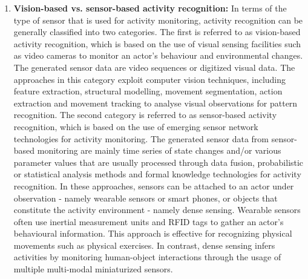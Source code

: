\begin{enumerate}
 \item \textbf{Vision-based vs. sensor-based activity recognition:} In terms of the type of sensor that is used for activity monitoring, activity recognition can be generally classified into two categories. The first is referred to as vision-based activity recognition, which is based on the use of visual sensing facilities such as video cameras to monitor an actor’s behaviour and environmental changes. The generated sensor data are video sequences or digitized visual data. The approaches in this category exploit computer vision techniques, including feature extraction, structural modelling, movement segmentation, action extraction and movement tracking to analyse visual observations for pattern recognition. The second category is referred to as sensor-based activity recognition, which is based on the use of emerging sensor network technologies for activity monitoring. The generated sensor data from sensor-based monitoring are mainly time series of state changes and/or various parameter values that are usually processed through data fusion, probabilistic or statistical analysis methods and formal knowledge technologies for activity recognition. In these approaches, sensors can be attached to an actor under observation - namely wearable sensors or smart phones, or objects that constitute the activity environment - namely dense sensing. Wearable sensors often use inertial measurement units and RFID tags to gather an actor’s behavioural information. This approach is effective for recognizing physical movements such as physical exercises. In contrast, dense sensing infers activities by monitoring human-object interactions through the usage of multiple multi-modal miniaturized sensors.


\end{enumerate}
